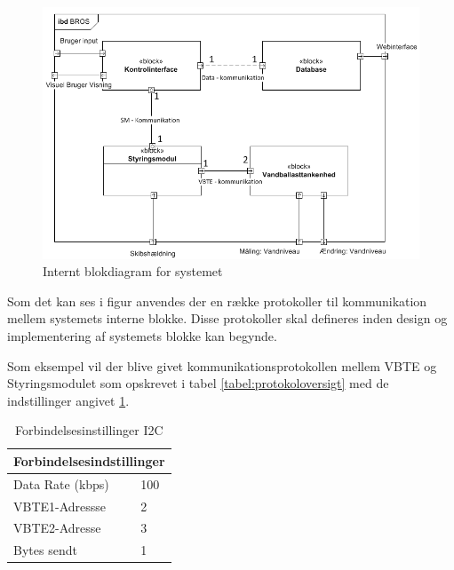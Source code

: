 \begin{figure}[H]
\centering
\includegraphics[scale=0.8]{billeder/Systemarkitektur/ibd_bros}
\caption{Internt blokdiagram for systemet}
\label{fig:idb_bros}
\end{figure}

Som det kan ses i figur anvendes der en række protokoller til kommunikation mellem systemets interne blokke. Disse protokoller skal defineres inden design og implementering af systemets blokke kan begynde.

Som eksempel vil der blive givet kommunikationsprotokollen mellem VBTE og Styringsmodulet som opskrevet i tabel \ref{tabel:protokoloversigt} med de indstillinger angivet \ref{tabel:forbindelsesindstillinger}.


\begin{table}[H]
\centering
\begin{tabular}{|l|l|}
\multicolumn{2}{l}{{\Large Forbindelsesindstillinger}} \\\hline
Data Rate (kbps)&100\\\hline
VBTE1-Adressse&2\\\hline
VBTE2-Adresse&3\\\hline
Bytes sendt&1\\\hline
\end{tabular}
\caption{Forbindelsesinstillinger I2C}
\label{tabel:forbindelsesindstillinger}
\end{table}

